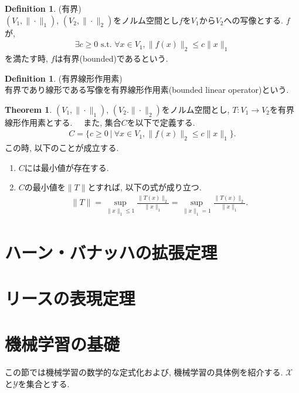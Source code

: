 \documentclass[11pt, a4paper, dvipdfmx]{jsarticle}
\theoremstyle{definition}
\newtheorem{Definition+}[Axiom+]{Definition}
\newtheorem{Theorem+}[Axiom+]{Theorem}
\newcommand{\X}{\mathcal{X}}
\newcommand{\Y}{\mathcal{Y}}
\begin{document}
\begin{Definition+}(有界)\\
    $(V_{1}, \|\cdot\|_{1})$, $(V_{2}, \|\cdot\|_{2})$をノルム空間とし$f$を$V_{1}$から$V_{2}$への写像とする.
    $f$が,
    \begin{align*}
        \exists c\geq 0\text{ s.t. }\forall x\in V_{1}, \|f(x)\|_{2}\leq c\|x\|_{1}
    \end{align*}
    を満たす時, $f$は有界(bounded)であるという.
\end{Definition+}

\begin{Definition+}(有界線形作用素)\\
    有界であり線形である写像を有界線形作用素(bounded linear operator)という.
\end{Definition+}
\newpage
\begin{Theorem+}
    $(V_{1}, \|\cdot\|_{1})$, $(V_2. \|\cdot\|_{2})$をノルム空間とし, $T:V_1\to V_2$を有界線形作用素とする.　
    また, 集合$C$を以下で定義する.
    \begin{align*}
        C = \{c\geq 0~|~\forall x\in V_{1}, \|f(x)\|_{2}\leq c\|x\|_{1}\}.
    \end{align*}
    この時, 以下のことが成立する.
    \begin{enumerate}
        \item $C$には最小値が存在する.
        \item $C$の最小値を$\|T\|$とすれば, 以下の式が成り立つ.
         \begin{align*}
             \|T\| = \sup_{\|x\|_{1}\leq 1}\frac{\|T(x)\|_{2}}{\|x\|_{1}} = \sup_{\|x\|_{1} = 1}\frac{\|T(x)\|_{2}}{\|x\|_{1}}.
         \end{align*}
    \end{enumerate}
\end{Theorem+}

\section{ハーン・バナッハの拡張定理}
\section{リースの表現定理}
\section{機械学習の基礎}
この節では機械学習の数学的な定式化および, 機械学習の具体例を紹介する. $\X$と$\Y$を集合とする.
\end{document}
